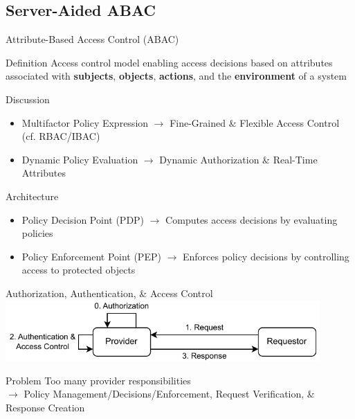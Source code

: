 \documentclass[en]{sdqbeamer}
\begin{document}
\subsection{Server-Aided ABAC}
\begin{frame}{Attribute-Based Access Control (ABAC)}
    \begin{greenblock}{Definition \parencite{JTF2020}}
        Access control model enabling access decisions based on attributes associated with \textbf{subjects}, \textbf{objects}, \textbf{actions}, and the \textbf{environment} of a system
    \end{greenblock}

    \begin{blueblock}{Discussion \parencite{Hu2014}}
        \begin{itemize}
            \item Multifactor Policy Expression $\rightarrow$ Fine-Grained \& Flexible Access Control (cf. RBAC/IBAC)
            \item Dynamic Policy Evaluation $\rightarrow$ Dynamic Authorization \& Real-Time Attributes
        \end{itemize}
    \end{blueblock}

    \begin{grayblock}{Architecture \parencite{Hu2014,Oasis2013}}
        \begin{itemize}
            \item Policy Decision Point (PDP) $\rightarrow$ Computes access decisions by evaluating policies
            \item Policy Enforcement Point (PEP) $\rightarrow$ Enforces policy decisions by controlling access to protected objects
        \end{itemize}
    \end{grayblock}
\end{frame}

\begin{frame}{Authorization, Authentication, \& Access Control}
    \centering
	\includegraphics[width=0.9\textwidth]{./figures/access_control_request_traditional.drawio.pdf}
    \begin{redblock}{Problem}
        Too many provider responsibilities
        \\$\rightarrow$ Policy Management/Decisions/Enforcement, Request Verification, \& Response Creation
    \end{redblock}
\end{frame}
\end{document}
